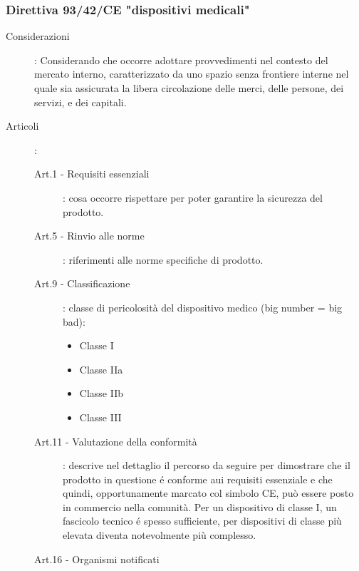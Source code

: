 \documentclass[a4paper]{article}
\begin{document}
\subsubsection{Direttiva 93/42/CE "dispositivi medicali"}
\begin{description}
    \item[Considerazioni]: Considerando che occorre adottare provvedimenti nel contesto 
    del mercato interno, caratterizzato da uno spazio senza frontiere interne nel quale 
    sia assicurata la libera circolazione delle merci, delle persone, dei servizi, e dei 
    capitali.
    \item[Articoli]: 
    \begin{description}
        \item[Art.1 - Requisiti essenziali]: cosa occorre rispettare per poter garantire 
        la sicurezza del prodotto.
        \item[Art.5 - Rinvio alle norme]: riferimenti alle norme specifiche di prodotto.
        \item[Art.9 - Classificazione]: classe di pericolosità del dispositivo medico (big number = big bad):
        \begin{itemize}
            \item Classe I
            \item Classe IIa
            \item Classe IIb
            \item Classe III
        \end{itemize}
        \item[Art.11 - Valutazione della conformità]: descrive nel dettaglio il percorso 
        da seguire per dimostrare che il prodotto in questione é conforme aui requisiti 
        essenziale e che quindi, opportunamente marcato col simbolo CE, può essere posto 
        in commercio nella comunità. Per un dispositivo di classe I, un fascicolo tecnico 
        é spesso sufficiente, per dispositivi di classe più elevata diventa notevolmente 
        più complesso.
        \item[Art.16 - Organismi notificati] 
    \end{description} 
\end{description}
\end{document}
